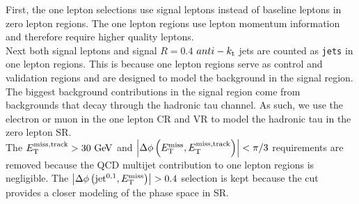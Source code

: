 \indent First, the one lepton selections use signal leptons instead of baseline leptons in zero lepton regions.  The one lepton regions use lepton momentum information and therefore require higher quality leptons.  \\

\indent Next both signal leptons and signal $R=0.4$ $anti-k_{\rm{t}}$ jets are counted as {\tt jets} in one lepton regions.  This is because one lepton regions serve as control and validation regions and are designed to model the background in the signal region.  The biggest background contributions in the signal region come from backgrounds that decay through the hadronic tau channel.  As such, we use the electron or muon in the one lepton CR and VR to model the hadronic tau in the zero lepton SR.  \\

\indent The $\mettrk > 30 \gev$ and $\dphimettrk < \pi/3$ requirements are removed because the QCD multijet contribution to one lepton regions is negligible.  The $\left|\Delta\phi\left(\mathrm{jet}^{0,1},E_{\mathrm{T}}^{\mathrm{miss}}\right)\right| > 0.4$ selection is kept because the cut provides a closer modeling of the phase space in SR. \\